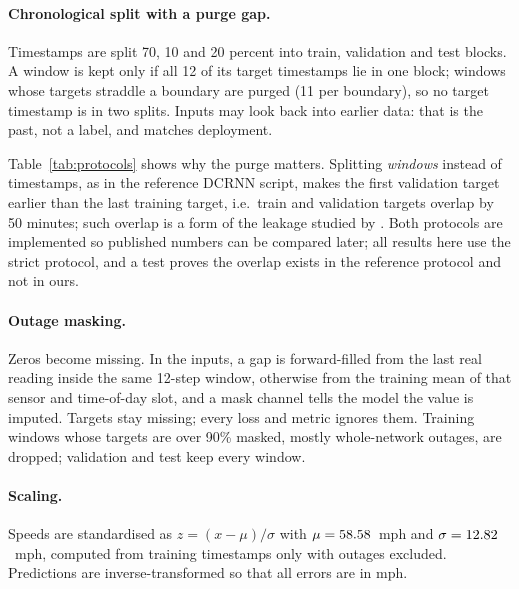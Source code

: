 \documentclass[11pt,a4paper]{article}
\begin{document}
\paragraph{Chronological split with a purge gap.}
Timestamps are split 70, 10 and 20 percent into train, validation and test blocks.
A window is kept only if all 12 of its target timestamps lie in one block; windows whose targets straddle a boundary are purged (11 per boundary), so no target timestamp is in two splits.
Inputs may look back into earlier data: that is the past, not a label, and matches deployment.
\begin{table}[ht]
\centering\small

\caption{Strict split: windows, rows (windows $\times$ 207 sensors), target period and share of masked targets. The training block also excludes \DroppedTrain{} windows whose targets are over 90\% masked.}
\label{tab:splits}
\end{table}
Table~\ref{tab:protocols} shows why the purge matters.
Splitting \emph{windows} instead of timestamps, as in the reference DCRNN script, makes the first validation target earlier than the last training target, i.e.\ train and validation targets overlap by 50 minutes; such overlap is a form of the leakage studied by \citet{kaufman2012leakage}.
Both protocols are implemented so published numbers can be compared later; all results here use the strict protocol, and a test proves the overlap exists in the reference protocol and not in ours.
\begin{table}[ht]
\centering\small

\caption{Strict timestamp split versus the reference window split.}
\label{tab:protocols}
\end{table}

\paragraph{Outage masking.}
Zeros become missing.
In the inputs, a gap is forward-filled from the last real reading inside the same 12-step window, otherwise from the training mean of that sensor and time-of-day slot, and a mask channel tells the model the value is imputed.
Targets stay missing; every loss and metric ignores them.
Training windows whose targets are over 90\% masked, mostly whole-network outages, are dropped; validation and test keep every window.

\paragraph{Scaling.}
Speeds are standardised as $z=(x-\mu)/\sigma$ with $\mu=58.58$~mph and $\sigma=12.82$~mph, computed from training timestamps only with outages excluded.
Predictions are inverse-transformed so that all errors are in mph.
\end{document}
